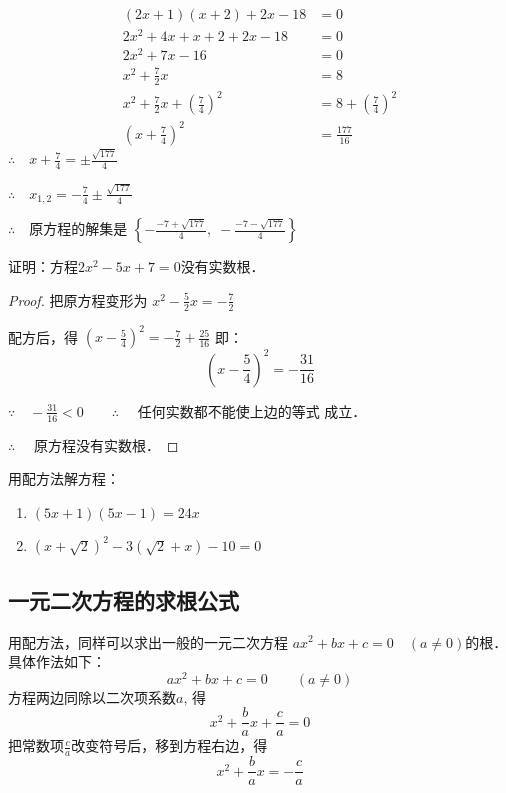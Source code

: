 \begin{solution}
\begin{align*}
    (2x+1)(x+2)+2x-18&=0\\
    2x^2+4x+x+2+2x-18&=0  \tag{去括号}\\
    2x^2+7x-16&=0  \tag{合并}\\
x^2+\frac{7}{2}x&=8  \tag{两边除以2}\\
x^2+\frac{7}{2}x+\left(\frac{7}{4}\right)^2&=8+\left(\frac{7}{4}\right)^2 \tag{配方}\\
\left(x+\frac{7}{4}\right)^2&=\frac{177}{16}
\end{align*}    
$\therefore\quad x+\frac{7}{4}=\pm\frac{\sqrt{177}}{4}$

$\therefore\quad x_{1,2}=-\frac{7}{4}\pm\frac{\sqrt{177}}{4}$

$\therefore\quad $原方程的解集是 $\left\{-\frac{-7+\sqrt{177}}{4},\; -\frac{-7-\sqrt{177}}{4}\right\}$
\end{solution}




\begin{example}
    证明：方程$2x^2-5x+7=0$没有实数根．
\end{example}

\begin{proof}
    把原方程变形为
    $x^2-\frac{5}{2}x=-\frac{7}{2}$

    配方后，得
    $\left(x-\frac{5}{4}\right)^2=-\frac{7}{2}+\frac{25}{16}$
    即：
    \[\left(x-\frac{5}{4}\right)^2=-\frac{31}{16} \]
    
    $\because\quad -\frac{31}{16}<0 \qquad \therefore\quad $
    任何实数都不能使上边的等式
    成立．
    
    $ \therefore\quad $ 原方程没有实数根．
\end{proof}

\begin{ex}
    用配方法解方程：
    \begin{enumerate}
        \item $(5x+1)(5x-1)=24x$
        \item $(x+\sqrt{2})^2-3(\sqrt{2}+x)-10=0$
    \end{enumerate}
\end{ex}

\subsection{一元二次方程的求根公式}
用配方法，同样可以求出一般的一元二次方程
$ax^2+bx+c=0\quad (a\ne 0)$的根．具体作法如下：
$$ax^2+bx+c=0\qquad (a\ne 0)$$
方程两边同除以二次项系数$a$, 得
$$x^2+\frac{b}{a}x+\frac{c}{a}=0$$
把常数项$\frac{c}{a}$改变符号后，移到方程右边，得
\[x^2+\frac{b}{a}x=-\frac{c}{a}\]


